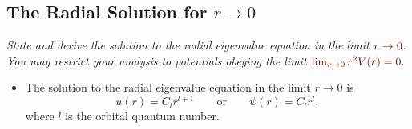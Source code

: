 \documentclass[11pt, a4paper]{article}
\newcommand{\qmath}[1]{\textcolor{Maroon}{#1}}  %
\begin{document}
\subsection{The Radial Solution for $ r \to 0 $}
\textit{State and derive the solution to the radial eigenvalue equation in the limit $ \qmath{r \to 0} $. You may restrict your analysis to potentials obeying the limit $ \qmath{\lim_{r \to 0} r^{2}V(r) = 0.} $}

\begin{itemize}
    \item The solution to the radial eigenvalue equation in the limit $ r \to 0 $ is
    \begin{equation*}
        u(r) = C_{l}r^{l+1} \qquad \text{or} \qquad \psi(r) = C_{l}r^{l},
    \end{equation*}
    where $ l $ is the orbital quantum number.
    
\end{itemize}
\end{document}
